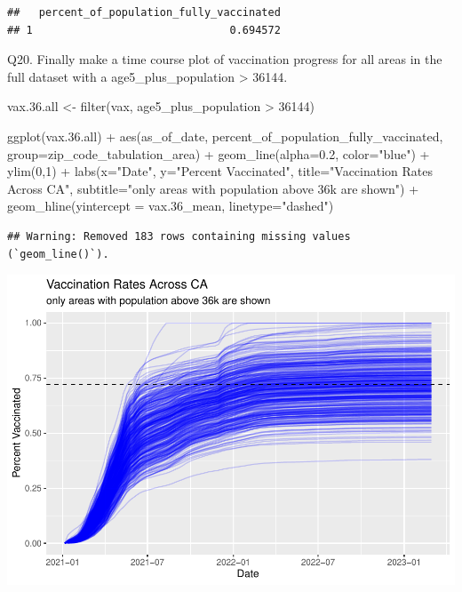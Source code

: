 \documentclass[
]{article}
\newenvironment{Shaded}{\begin{snugshade}}{\end{snugshade}}
\newcommand{\AttributeTok}[1]{\textcolor[rgb]{0.77,0.63,0.00}{#1}}
\newcommand{\DecValTok}[1]{\textcolor[rgb]{0.00,0.00,0.81}{#1}}
\newcommand{\FloatTok}[1]{\textcolor[rgb]{0.00,0.00,0.81}{#1}}
\newcommand{\FunctionTok}[1]{\textcolor[rgb]{0.00,0.00,0.00}{#1}}
\newcommand{\NormalTok}[1]{#1}
\newcommand{\OtherTok}[1]{\textcolor[rgb]{0.56,0.35,0.01}{#1}}
\newcommand{\SpecialCharTok}[1]{\textcolor[rgb]{0.00,0.00,0.00}{#1}}
\newcommand{\StringTok}[1]{\textcolor[rgb]{0.31,0.60,0.02}{#1}}
\begin{document}
\begin{verbatim}
##   percent_of_population_fully_vaccinated
## 1                               0.694572
\end{verbatim}

Q20. Finally make a time course plot of vaccination progress for all
areas in the full dataset with a age5\_plus\_population \textgreater{}
36144.

\begin{Shaded}
\begin{Highlighting}[]
\NormalTok{vax.}\FloatTok{36.}\NormalTok{all }\OtherTok{\textless{}{-}} \FunctionTok{filter}\NormalTok{(vax, age5\_plus\_population }\SpecialCharTok{\textgreater{}} \DecValTok{36144}\NormalTok{)}

\FunctionTok{ggplot}\NormalTok{(vax.}\FloatTok{36.}\NormalTok{all) }\SpecialCharTok{+}
  \FunctionTok{aes}\NormalTok{(as\_of\_date,}
\NormalTok{      percent\_of\_population\_fully\_vaccinated, }
      \AttributeTok{group=}\NormalTok{zip\_code\_tabulation\_area) }\SpecialCharTok{+}
  \FunctionTok{geom\_line}\NormalTok{(}\AttributeTok{alpha=}\FloatTok{0.2}\NormalTok{, }\AttributeTok{color=}\StringTok{"blue"}\NormalTok{) }\SpecialCharTok{+}
  \FunctionTok{ylim}\NormalTok{(}\DecValTok{0}\NormalTok{,}\DecValTok{1}\NormalTok{) }\SpecialCharTok{+}
  \FunctionTok{labs}\NormalTok{(}\AttributeTok{x=}\StringTok{"Date"}\NormalTok{, }\AttributeTok{y=}\StringTok{"Percent Vaccinated"}\NormalTok{,}
       \AttributeTok{title=}\StringTok{"Vaccination Rates Across CA"}\NormalTok{,}
       \AttributeTok{subtitle=}\StringTok{"only areas with population above 36k are shown"}\NormalTok{) }\SpecialCharTok{+}
  \FunctionTok{geom\_hline}\NormalTok{(}\AttributeTok{yintercept =}\NormalTok{ vax}\FloatTok{.36}\NormalTok{\_mean, }\AttributeTok{linetype=}\StringTok{"dashed"}\NormalTok{)}
\end{Highlighting}
\end{Shaded}

\begin{verbatim}
## Warning: Removed 183 rows containing missing values (`geom_line()`).
\end{verbatim}

\includegraphics{Lab-17-MiniAssn_files/figure-latex/unnamed-chunk-32-1.pdf}
\end{document}

